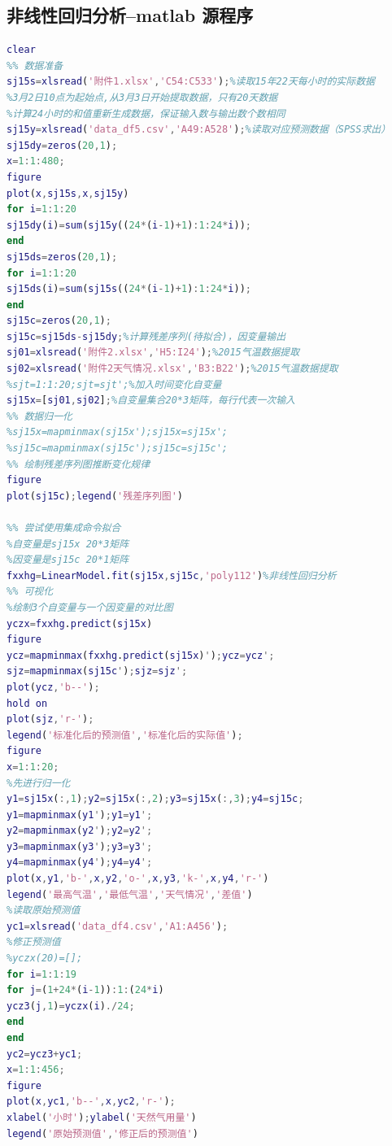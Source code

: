 \documentclass{whutmod}
\begin{document}
\subsection{非线性回归分析--matlab 源程序}
\begin{lstlisting}[language=matlab]
clear
%% 数据准备
sj15s=xlsread('附件1.xlsx','C54:C533');%读取15年22天每小时的实际数据
%3月2日10点为起始点,从3月3日开始提取数据，只有20天数据
%计算24小时的和值重新生成数据，保证输入数与输出数个数相同
sj15y=xlsread('data_df5.csv','A49:A528');%读取对应预测数据（SPSS求出）
sj15dy=zeros(20,1);
x=1:1:480;
figure
plot(x,sj15s,x,sj15y)
for i=1:1:20
sj15dy(i)=sum(sj15y((24*(i-1)+1):1:24*i));
end
sj15ds=zeros(20,1);
for i=1:1:20
sj15ds(i)=sum(sj15s((24*(i-1)+1):1:24*i));
end
sj15c=zeros(20,1);
sj15c=sj15ds-sj15dy;%计算残差序列(待拟合)，因变量输出
sj01=xlsread('附件2.xlsx','H5:I24');%2015气温数据提取
sj02=xlsread('附件2天气情况.xlsx','B3:B22');%2015气温数据提取
%sjt=1:1:20;sjt=sjt';%加入时间变化自变量
sj15x=[sj01,sj02];%自变量集合20*3矩阵，每行代表一次输入
%% 数据归一化
%sj15x=mapminmax(sj15x');sj15x=sj15x';
%sj15c=mapminmax(sj15c');sj15c=sj15c';
%% 绘制残差序列图推断变化规律
figure
plot(sj15c);legend('残差序列图')

%% 尝试使用集成命令拟合
%自变量是sj15x 20*3矩阵
%因变量是sj15c 20*1矩阵
fxxhg=LinearModel.fit(sj15x,sj15c,'poly112')%非线性回归分析
%% 可视化
%绘制3个自变量与一个因变量的对比图
yczx=fxxhg.predict(sj15x)
figure
ycz=mapminmax(fxxhg.predict(sj15x)');ycz=ycz';
sjz=mapminmax(sj15c');sjz=sjz';
plot(ycz,'b--');
hold on
plot(sjz,'r-');
legend('标准化后的预测值','标准化后的实际值');
figure
x=1:1:20;
%先进行归一化
y1=sj15x(:,1);y2=sj15x(:,2);y3=sj15x(:,3);y4=sj15c;
y1=mapminmax(y1');y1=y1';
y2=mapminmax(y2');y2=y2';
y3=mapminmax(y3');y3=y3';
y4=mapminmax(y4');y4=y4';
plot(x,y1,'b-',x,y2,'o-',x,y3,'k-',x,y4,'r-')
legend('最高气温','最低气温','天气情况','差值')
%读取原始预测值
yc1=xlsread('data_df4.csv','A1:A456');
%修正预测值
%yczx(20)=[];
for i=1:1:19
for j=(1+24*(i-1)):1:(24*i)
ycz3(j,1)=yczx(i)./24;
end
end
yc2=ycz3+yc1;
x=1:1:456;
figure
plot(x,yc1,'b--',x,yc2,'r-');
xlabel('小时');ylabel('天然气用量')
legend('原始预测值','修正后的预测值')

\end{lstlisting}
\end{document}
